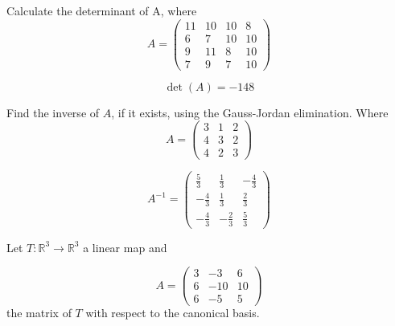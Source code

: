\begin{questions}

\question Calculate the determinant of A, where
$$
A=\left(\begin{array}{rrrr}
11 & 10 & 10 & 8 \\
6 & 7 & 10 & 10 \\
9 & 11 & 8 & 10 \\
7 & 9 & 7 & 10
\end{array}\right)
$$

\begin{solution}
$$\det(A)=-148$$
\end{solution}

\question Find the inverse of $A$, if it exists, using the Gauss-Jordan elimination. Where
$$
A=\left(\begin{array}{rrr}
3 & 1 & 2 \\
4 & 3 & 2 \\
4 & 2 & 3
\end{array}\right)
$$

\begin{solution}
$$A^{-1}=\left(\begin{array}{rrr}
\frac{5}{3} & \frac{1}{3} & -\frac{4}{3} \\
-\frac{4}{3} & \frac{1}{3} & \frac{2}{3} \\
-\frac{4}{3} & -\frac{2}{3} & \frac{5}{3}
\end{array}\right)$$
\end{solution}

\question Let $T:\mathbb{R}^3\rightarrow\mathbb{R}^3$  a linear map and
 
$$
A=\left(\begin{array}{rrr}
3 & -3 & 6 \\
6 & -10 & 10 \\
6 & -5 & 5
\end{array}\right)
$$
the matrix of $T$ with respect to the canonical basis.
\end{questions}
